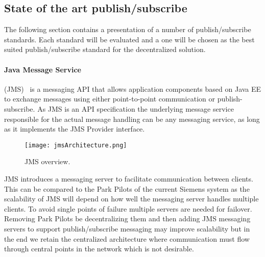 



\subsection{State of the art publish/subscribe}
\label{sec:stateArtPublish}
The following section contains a presentation of a number of publish/subscribe standards. Each standard will be evaluated and a one will be chosen as the best suited publish/subscribe standard for the decentralized solution.

\paragraph{Java Message Service} (JMS)~\cite{hapner2002java} is a messaging API that allows application components based on Java EE to exchange messages using either point-to-point communication or publish-subscribe. As JMS is an API specification the underlying message service responsible for the actual message handling can be any messaging service, as long as it implements the JMS Provider interface.

\begin{figure}[!h]
	\centering
	\texttt{[image: jmsArchitecture.png]} 
	\caption[JMS overview]{
		\label{fig:jmsOverview} 
		\footnotesize{%
			JMS overview.
		}
	}
\end{figure}

JMS introduces a messaging server to facilitate communication between clients. This can be compared to the Park Pilots of the current Siemens system as the scalability of JMS will depend on how well the messaging server handles multiple clients. To avoid single points of failure multiple servers are needed for failover. Removing Park Pilots be decentralizing them and then adding JMS messaging servers to support publish/subscribe messaging may improve scalability but in the end we retain the centralized architecture where communication must flow through central points in the network which is not desirable. 

